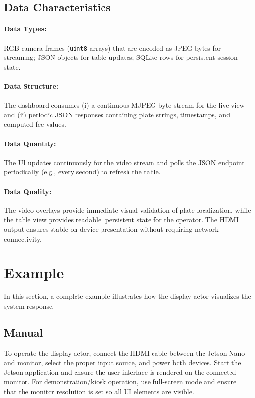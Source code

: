 \subsection{Data Characteristics}
\paragraph{Data Types:} RGB camera frames (\texttt{uint8} arrays) that are encoded as JPEG bytes for streaming; JSON objects for table updates; SQLite rows for persistent session state.

\paragraph{Data Structure:} The dashboard consumes (i) a continuous MJPEG byte stream for the live view and (ii) periodic JSON responses containing plate strings, timestamps, and computed fee values.

\paragraph{Data Quantity:} The UI updates continuously for the video stream and polls the JSON endpoint periodically (e.g., every second) to refresh the table.

\paragraph{Data Quality:} The video overlays provide immediate visual validation of plate localization, while the table view provides readable, persistent state for the operator.
The \ac{HDMI} output ensures stable on-device presentation without requiring network connectivity.

\section{Example}
In this section, a complete example illustrates how the display actor visualizes the system response.

\subsection{Manual}
To operate the display actor, connect the \ac{HDMI} cable between the Jetson Nano and monitor, select the proper input source, and power both devices.
Start the Jetson application and ensure the user interface is rendered on the connected monitor.
For demonstration/kiosk operation, use full-screen mode and ensure that the monitor resolution is set so all UI elements are visible.

